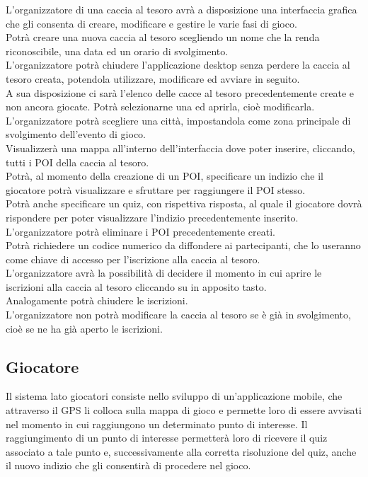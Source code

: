 \documentclass[12pt, italian]{article}
\begin{document}
L’organizzatore di una caccia al tesoro avrà a disposizione una interfaccia grafica che gli consenta di creare, modificare e gestire le varie fasi di gioco.\\
Potrà creare una nuova caccia al tesoro scegliendo un nome che la renda riconoscibile, una data ed un orario di svolgimento.\\
L’organizzatore potrà chiudere l’applicazione desktop senza perdere la caccia al tesoro creata, potendola utilizzare, modificare ed avviare in seguito.\\
A sua disposizione ci sarà l’elenco delle cacce al tesoro precedentemente create e non ancora giocate. Potrà selezionarne una ed aprirla, cioè modificarla.\\
L’organizzatore potrà scegliere una città, impostandola come zona principale di svolgimento dell’evento di gioco.\\
Visualizzerà una mappa all’interno dell’interfaccia dove poter inserire, cliccando, tutti i POI della caccia al tesoro.\\
Potrà, al momento della creazione di un POI, specificare un indizio che il giocatore potrà visualizzare e sfruttare per raggiungere il POI stesso.\\
Potrà anche specificare un quiz, con rispettiva risposta, al quale il giocatore dovrà rispondere per poter visualizzare l’indizio precedentemente inserito.\\
L’organizzatore potrà eliminare i POI precedentemente creati.\\
Potrà richiedere un codice numerico da diffondere ai partecipanti, che lo useranno come chiave di accesso per l’iscrizione alla caccia al tesoro.\\
L’organizzatore avrà la possibilità di decidere il momento in cui aprire le iscrizioni alla caccia al tesoro cliccando su in apposito tasto.\\
Analogamente potrà chiudere le iscrizioni.\\
L’organizzatore non potrà modificare la caccia al tesoro se è già in svolgimento, cioè se ne ha già aperto le iscrizioni.\\


\subsection{Giocatore}
Il sistema lato giocatori consiste nello sviluppo di un'applicazione mobile, che attraverso il GPS li colloca sulla mappa di gioco e permette loro di essere avvisati nel momento in cui raggiungono un determinato punto di interesse. Il raggiungimento di un punto di interesse permetterà loro di ricevere il quiz associato a tale punto e, successivamente alla corretta risoluzione del quiz, anche il nuovo indizio che gli consentirà di procedere nel gioco.
\end{document}
